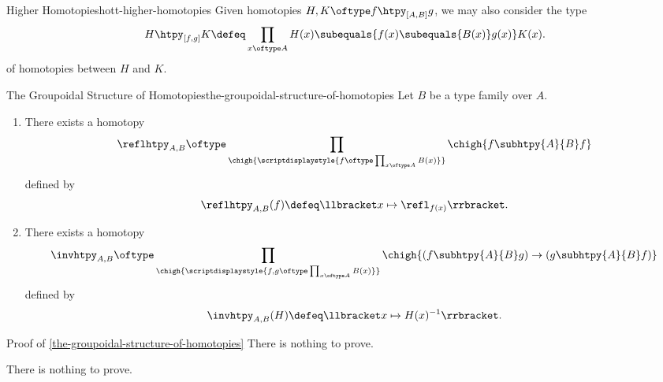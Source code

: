 \begin{remark}{Higher Homotopies}{hott-higher-homotopies}%
    Given homotopies $H,K\oftype f\htpy_{[A,B]}g$, we may also consider the type
    \[
        H\htpy_{[f,g]}K%
        \defeq%
        \prod_{x\oftype A}H(x)\subequals{f(x)\subequals{B(x)}g(x)}K(x).%
    \]%
    of homotopies between $H$ and $K$.
\end{remark}
\begin{proposition}{The Groupoidal Structure of Homotopies}{the-groupoidal-structure-of-homotopies}%
    Let $B$ be a type family over $A$.
    \begin{enumerate}
        \item\label{the-groupoidal-structure-of-homotopies-reflexivity}There exists a homotopy
            \[
                \reflhtpy_{A,B}%
                \oftype%
                \prod_{\chigh{\scriptdisplaystyle{f\oftype\prod_{x\oftype A}B(x)}}}\chigh{f\subhtpy{A}{B}f}%
            \]%
            defined by
            \[
                \reflhtpy_{A,B}(f)%
                \defeq%
                \llbracket x\mapsto\refl_{f(x)}\rrbracket.%
            \]%
        \item\label{the-groupoidal-structure-of-homotopies-inversion}There exists a homotopy
            \[
                \invhtpy_{A,B}%
                \oftype%
                \prod_{\chigh{\scriptdisplaystyle{f,g\oftype\prod_{x\oftype A}B(x)}}}\chigh{(f\subhtpy{A}{B}g)\to(g\subhtpy{A}{B}f)}%
            \]%
            defined by
            \[
                \invhtpy_{A,B}(H)%
                \defeq%
                \llbracket x\mapsto H(x)^{-1}\rrbracket.%
            \]%
    \end{enumerate}
\end{proposition}
\begin{Proof}{Proof of \cref{the-groupoidal-structure-of-homotopies}}%
    There is nothing to prove.

    There is nothing to prove.
\end{Proof}
\begin{appendices}

\end{appendices}

